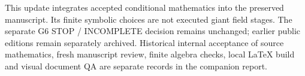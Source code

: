This update integrates accepted conditional mathematics into the
preserved manuscript. Its finite symbolic choices are not executed giant
field stages. The separate G6 STOP / INCOMPLETE decision remains unchanged; earlier
public editions remain separately archived. Historical internal acceptance of source
mathematics, fresh manuscript review, finite algebra checks, local LaTeX
build and visual document QA are separate records in the companion report.
\endgroup
